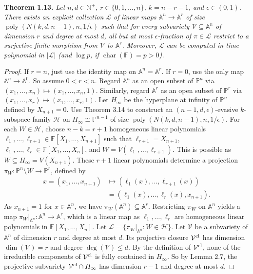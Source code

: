 \documentclass[10pt,a4paper]{article}
\newcommand{\FF}{\mathbb F}
\newcommand{\PP}{\mathbb P}
\newcommand{\Aspace}{\mathbb A}
\newenvironment{result}[1]{\par\medskip\noindent\textbf{#1.}\itshape}{\par\medskip}
\begin{document}
\begin{result}{Theorem 1.13}
Let $n,d\in\mathbb N^+$, $r\in\{0,1,\ldots,n\}$, $k=n-r-1$, and $\epsilon\in(0,1)$. There exists an explicit collection $\mathcal L$ of linear maps $\Aspace^n\to\Aspace^r$ of size $\operatorname{poly}(N(k,d,n-1),n,1/\epsilon)$ such that for every subvariety $\mathcal V\subseteq\Aspace^n$ of dimension $r$ and degree at most $d$, all but at most $\epsilon$-fraction of $\pi\in\mathcal L$ restrict to a surjective finite morphism from $\mathcal V$ to $\Aspace^r$. Moreover, $\mathcal L$ can be computed in time polynomial in $|\mathcal L|$ (and $\log p$, if $\operatorname{char}(\FF)=p>0$).
\end{result}
\begin{proof}
If $r=n$, just use the identity map on $\Aspace^n=\Aspace^r$. If $r=0$, use the only map $\Aspace^n\to\Aspace^0$. So assume $0<r<n$. Regard $\Aspace^n$ as an open subset of $\PP^n$ via $(x_1,\ldots,x_n)\mapsto(x_1,\ldots,x_n,1)$. Similarly, regard $\Aspace^r$ as an open subset of $\PP^r$ via $(x_1,\ldots,x_r)\mapsto(x_1,\ldots,x_r,1)$. Let $H_\infty$ be the hyperplane at infinity of $\PP^n$ defined by $X_{n+1}=0$.
Use Theorem 3.14 to construct an $(n-1,d,\epsilon)$-evasive $k$-subspace family $\mathcal H$ on $H_\infty\cong\PP^{n-1}$ of size $\operatorname{poly}(N(k,d,n-1),n,1/\epsilon)$. For each $W\in\mathcal H$, choose $n-k=r+1$ homogeneous linear polynomials $\ell_1,\ldots,\ell_{r+1}\in\FF[X_1,\ldots,X_{n+1}]$ such that $\ell_{r+1}=X_{n+1}$, $\ell_1,\ldots,\ell_r\in\FF[X_1,\ldots,X_n]$, and $W=V(\ell_1,\ldots,\ell_{r+1})$. This is possible as $W\subseteq H_\infty=V(X_{n+1})$.
These $r+1$ linear polynomials determine a projection $\pi_W:\PP^n\setminus W\to\PP^r$, defined by
\begin{align*}
x=(x_1,\ldots,x_{n+1})&\mapsto(\ell_1(x),\ldots,\ell_{r+1}(x))\\
&=(\ell_1(x),\ldots,\ell_r(x),x_{n+1}).
\end{align*}
As $x_{n+1}=1$ for $x\in\Aspace^n$, we have $\pi_W(\Aspace^n)\subseteq\Aspace^r$. Restricting $\pi_W$ on $\Aspace^n$ yields a map $\pi_W|_{\Aspace^n}:\Aspace^n\to\Aspace^r$, which is a linear map as $\ell_1,\ldots,\ell_r$ are homogeneous linear polynomials in $\FF[X_1,\ldots,X_n]$. Let $\mathcal L=\{\pi_W|_{\Aspace^n}:W\in\mathcal H\}$.
Let $\mathcal V$ be a subvariety of $\Aspace^n$ of dimension $r$ and degree at most $d$. Its projective closure $\mathcal V^{\rm cl}$ has dimension $\dim(\mathcal V)=r$ and degree $\deg(\mathcal V)\le d$. By the definition of $\mathcal V^{\rm cl}$, none of the irreducible components of $\mathcal V^{\rm cl}$ is fully contained in $H_\infty$. So by Lemma 2.7, the projective subvariety $\mathcal V^{\rm cl}\cap H_\infty$ has dimension $r-1$ and degree at most $d$.

\end{proof}
\end{document}
